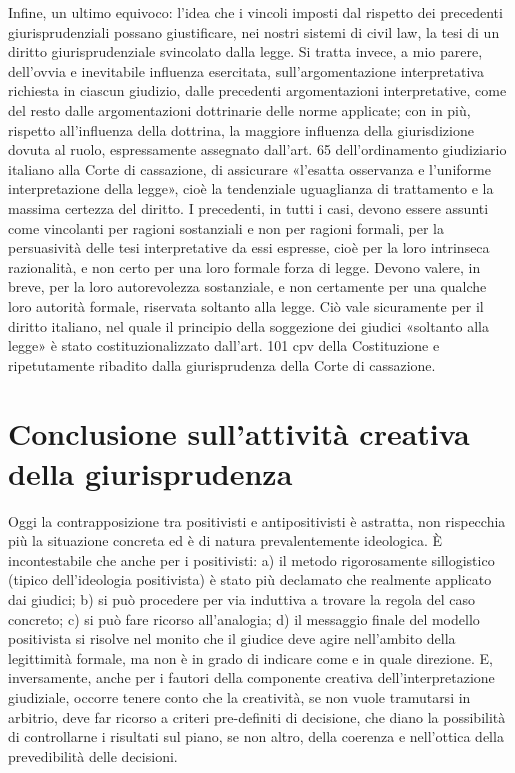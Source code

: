 Infine, un ultimo equivoco: l’idea che i vincoli imposti dal rispetto dei precedenti giurisprudenziali possano giustificare, nei nostri sistemi di civil law, la tesi di un diritto giurisprudenziale svincolato dalla legge. Si tratta invece, a mio parere, dell’ovvia e inevitabile influenza esercitata, sull’argomentazione interpretativa richiesta in ciascun giudizio, dalle precedenti argomentazioni interpretative, come del resto dalle argomentazioni dottrinarie delle norme applicate; con in più, rispetto all’influenza della dottrina, la maggiore influenza della giurisdizione dovuta al ruolo, espressamente assegnato dall’art. 65 dell’ordinamento giudiziario italiano alla Corte di cassazione, di assicurare «l’esatta osservanza e l’uniforme interpretazione della legge», cioè la tendenziale uguaglianza di trattamento e la massima certezza del diritto. I precedenti, in tutti i casi, devono essere assunti come vincolanti per ragioni sostanziali e non per ragioni formali, per la persuasività delle tesi interpretative da essi espresse, cioè per la loro intrinseca razionalità, e non certo per una loro formale forza di legge. Devono valere, in breve, per la loro autorevolezza sostanziale, e non certamente per una qualche loro autorità formale, riservata soltanto alla legge. Ciò vale sicuramente per il diritto italiano, nel quale il principio della soggezione dei giudici «soltanto alla legge» è stato costituzionalizzato dall’art. 101 cpv della Costituzione e ripetutamente ribadito dalla giurisprudenza della Corte di cassazione.

\section{Conclusione sull'attività creativa della giurisprudenza}

Oggi la contrapposizione tra positivisti e antipositivisti è astratta, non rispecchia più la situazione concreta ed è di natura prevalentemente ideologica. È incontestabile che anche per i positivisti:
a) il metodo rigorosamente sillogistico (tipico dell'ideologia positivista) è stato più declamato che realmente applicato dai giudici; 
b) si può procedere per via induttiva a trovare la regola del caso concreto; 
c) si può fare ricorso all'analogia; 
d) il messaggio finale del modello positivista si risolve nel monito che il giudice deve agire nell'ambito della legittimità formale, ma non è in grado di indicare come e in quale direzione.
E, inversamente, anche per i fautori della componente creativa dell'interpretazione giudiziale, occorre tenere conto che la creatività, se non vuole tramutarsi in arbitrio, deve far ricorso a criteri pre-definiti di decisione, che diano la possibilità di controllarne i risultati sul piano, se non altro, della coerenza e nell'ottica della prevedibilità delle decisioni. 

